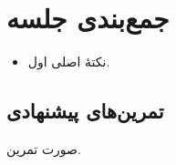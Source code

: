 \section*{جمع‌بندی جلسه}

\begin{summary}
\begin{itemize}
  \item نکتهٔ اصلی اول.
\end{itemize}
\end{summary}

\subsection*{تمرین‌های پیشنهادی}

\begin{exercise}
صورت تمرین.
\end{exercise}
